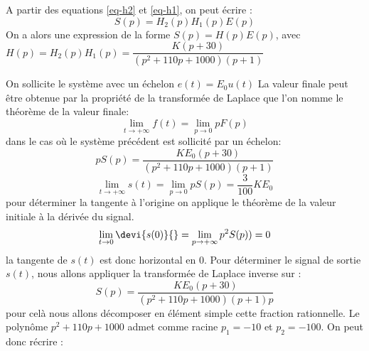 \question{}
A partir des equations \ref{eq-h2} et \ref{eq-h1}, on peut écrire :
\[
    S(p) = H_2(p) H_1(p) E(p)
\]
On a alors une expression de la forme $S(p) =H(p) E(p)$,
avec $H(p)=H_2(p) H_1(p)=\dfrac{K(p+30)}{(p^2+110p+1000)(p+1)}$
\begin{center}
\end{center}
On sollicite le système avec un échelon $e(t)=E_0 u(t)$
\question{}
La valeur finale peut être obtenue par la propriété de la transformée 
de Laplace que l'on nomme le théorème de la valeur finale:
\[
\lim\limits_{t \rightarrow +\infty} f(t) = \lim\limits_{p \rightarrow 0} pF(p)
\]
dans le cas où le système précédent est sollicité par un échelon:
\[
pS(p)=\dfrac{KE_0(p+30)}{(p^2+110p+1000)(p+1)}
\]
\[
\lim\limits_{t \rightarrow +\infty} s(t) = \lim\limits_{p \rightarrow 0} pS(p) 
                                         = \dfrac{3}{100}KE_0
\]
pour déterminer la tangente à l'origine on applique le théorème de la valeur 
initiale à la dérivée du signal.
\[
\lim\limits_{t \rightarrow 0} \devi{s(0)}{} = 
\lim\limits_{p \rightarrow +\infty} p^2S(p))= 0
\]
la tangente de $s(t)$ est donc horizontal en 0.
\question{}
Pour déterminer le signal de sortie $s(t)$, nous allons appliquer la 
transformée de Laplace inverse sur :
\[
S(p) = \dfrac{KE_0(p+30)}{(p^2+110p+1000)(p+1)p}
\]
pour celà nous allons décomposer en élément simple cette fraction rationnelle. 
Le polynôme $p^2+110p+1000$ admet comme racine $p_1=-10$ et $p_2=-100$. 
On peut donc récrire : 
